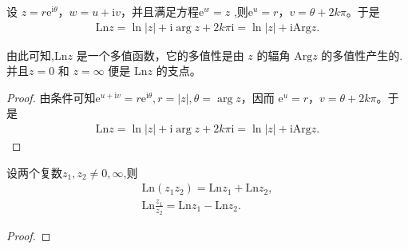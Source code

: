 \documentclass[../../main.tex]{subfiles}%
\begin{document}
\begin{theorem}
设 \( z = r\mathrm{e}^{\mathrm{i}\theta} \)，\( w = u + \mathrm{i}v \)，并且满足方程\( \mathrm{e}^w = z \) ,则\( \mathrm{e}^u = r \)，\( v = \theta + 2k\pi \)。于是
\begin{align*}
\mathrm{Ln} z = \ln|z| + \mathrm{i}\arg z + 2k\pi\mathrm{i} = \ln|z| + \mathrm{i}\mathrm{Arg} z.
\end{align*}
\end{theorem}
\begin{remark}
由此可知,\( \mathrm{Ln} z \) 是一个多值函数，它的多值性是由 \( z \) 的辐角 \( \mathrm{Arg} z \) 的多值性产生的.
并且\( z = 0 \) 和 \( z = \infty \) 便是 \( \mathrm{Ln} z \) 的支点。
\end{remark}
\begin{proof}

由条件可知\( \mathrm{e}^{u + \mathrm{i}v} = r\mathrm{e}^{\mathrm{i}\theta} ,r=|z|,\theta = \arg z\)，因而 \( \mathrm{e}^u = r \)，\( v = \theta + 2k\pi \)。于是
\begin{align*}
\mathrm{Ln} z = \ln|z| + \mathrm{i}\arg z + 2k\pi\mathrm{i} = \ln|z| + \mathrm{i}\mathrm{Arg} z.
\end{align*}

\end{proof}

\begin{theorem}[对数函数的基本性质]
设两个复数$z_1,z_2\neq 0,\infty$,则
\begin{gather*}
\mathrm{Ln}\left( z_1z_2 \right) =\mathrm{Ln}z_1+\mathrm{Ln}z_2,
\\
\mathrm{Ln}\frac{z_1}{z_2}=\mathrm{Ln}z_1-\mathrm{Ln}z_2.
\end{gather*}
\end{theorem}
\begin{proof}



\end{proof}
\end{document}
